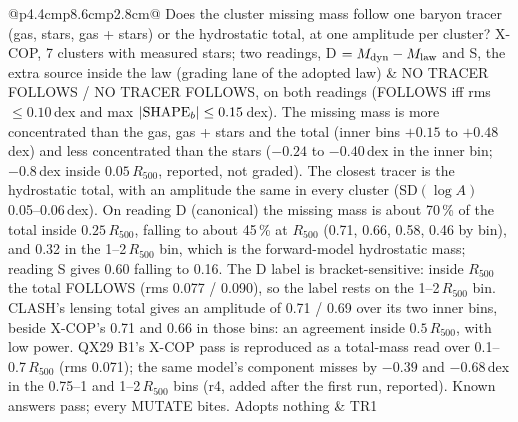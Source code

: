 \documentclass[10pt]{article}
\begin{document}
\begin{longtable}{@{}p{4.4cm}p{8.6cm}p{2.8cm}@{}}
Does the cluster missing mass follow one baryon tracer (gas, stars, gas + stars) or the hydrostatic total, at one amplitude per cluster? X-COP, 7 clusters with measured stars; two readings, D $=M_{\rm dyn}-M_{\rm law}$ and S, the extra source inside the law (grading lane of the adopted law) & NO TRACER FOLLOWS / NO TRACER FOLLOWS, on both readings (FOLLOWS iff rms $\le0.10$\,dex and max $|{\rm SHAPE}_b|\le0.15$\,dex). The missing mass is more concentrated than the gas, gas + stars and the total (inner bins $+0.15$ to $+0.48$\,dex) and less concentrated than the stars ($-0.24$ to $-0.40$\,dex in the inner bin; $-0.8$\,dex inside $0.05\,R_{500}$, reported, not graded). The closest tracer is the hydrostatic total, with an amplitude the same in every cluster (SD$(\log A)$ 0.05--0.06\,dex). On reading D (canonical) the missing mass is about 70\,\% of the total inside $0.25\,R_{500}$, falling to about 45\,\% at $R_{500}$ (0.71, 0.66, 0.58, 0.46 by bin), and 0.32 in the 1--2\,$R_{500}$ bin, which is the forward-model hydrostatic mass; reading S gives 0.60 falling to 0.16. The D label is bracket-sensitive: inside $R_{500}$ the total FOLLOWS (rms 0.077 / 0.090), so the label rests on the 1--2\,$R_{500}$ bin. CLASH's lensing total gives an amplitude of 0.71 / 0.69 over its two inner bins, beside X-COP's 0.71 and 0.66 in those bins: an agreement inside $0.5\,R_{500}$, with low power. QX29 B1's X-COP pass is reproduced as a total-mass read over 0.1--0.7\,$R_{500}$ (rms 0.071); the same model's component misses by $-0.39$ and $-0.68$\,dex in the 0.75--1 and 1--2\,$R_{500}$ bins (r4, added after the first run, reported). Known answers pass; every MUTATE bites. Adopts nothing & TR1\\
\\

\end{longtable}
\end{document}
